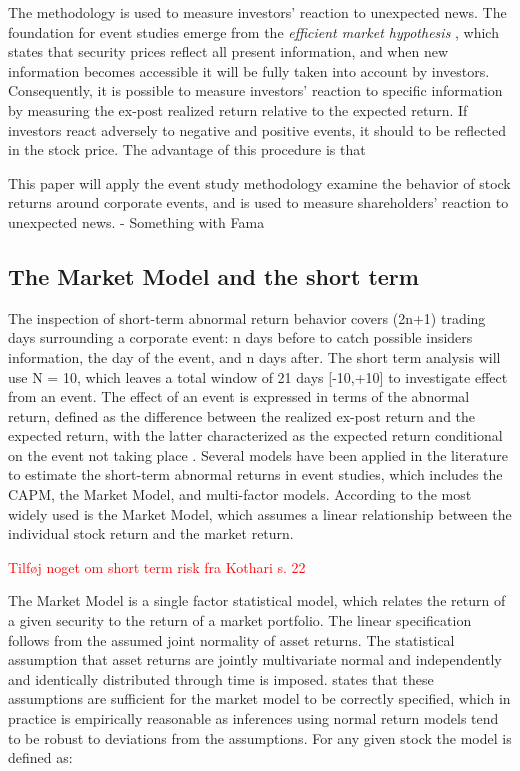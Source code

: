 The methodology is used to measure investors' reaction to unexpected news. The foundation for event studies emerge from the \textit{efficient market hypothesis} \citep{fama1969_EMH}, which states that security prices reflect all present information, and when new information becomes accessible it will be fully taken into account by investors. Consequently, it is possible to measure investors' reaction to specific information by measuring the ex-post realized return relative to the expected return. If investors react adversely to negative and positive events, it should to be reflected in the stock price. The advantage of this procedure is that 


This paper will apply the event study methodology examine the behavior of stock returns around corporate events, and is used to measure shareholders' reaction to unexpected news. 
- Something with Fama



\subsection{The Market Model and the short term}

The inspection of short-term abnormal return behavior covers (2n+1) trading days surrounding a corporate event: n days before to catch possible insiders information, the day of the event, and n days after. The short term analysis will use N = 10, which leaves a total window of 21 days [-10,+10] to investigate effect from an event. The effect of an event is expressed in terms of the abnormal return, defined as the difference between the realized ex-post return and the expected return, with the latter characterized as the expected return conditional on the event not taking place \citep{Event_studies}. Several models have been applied in the literature to estimate the short-term abnormal returns in event studies, which includes the CAPM, the Market Model, and multi-factor models. According to \cite{holler2014event} the most widely used is the Market Model, which assumes a linear relationship between the individual stock return and the market return. 

 \textcolor{red}{Tilføj noget om short term risk fra Kothari s. 22} 

The Market Model is a single factor statistical model, which relates the return of a given security to the return of a market portfolio. The linear specification follows from the assumed joint normality of asset returns. The statistical assumption that asset returns are jointly multivariate normal and independently and identically distributed through time is imposed. \cite{Event_studies} states that these assumptions are sufficient for the market model to be correctly specified, which in practice is empirically reasonable as inferences using normal return models tend to be robust to deviations from the assumptions.    For any given stock the model is defined as:

